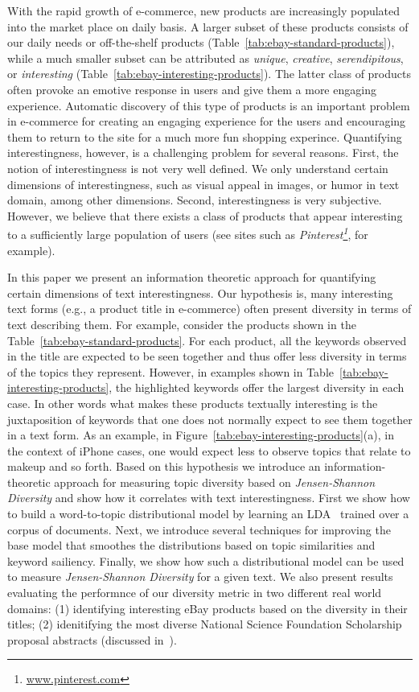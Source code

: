 


With the rapid growth of e-commerce, new products are increasingly populated into the market place on daily basis.  A larger subset of these products consists of our daily needs or off-the-shelf products (Table~\ref{tab:ebay-standard-products}), while a much smaller subset can be attributed as {\em unique}, {\em creative}, {\em serendipitous}, or {\em interesting} (Table~\ref{tab:ebay-interesting-products}). The latter class of products often provoke an emotive response in users and give them a more engaging experience. Automatic discovery of this type of products is an important problem in e-commerce for creating an engaging experience for the users and encouraging them to return to the site for a much more fun shopping experince. Quantifying interestingness, however,  is a challenging problem for several reasons. First, the notion of interestingness is not very well defined. We only understand certain dimensions of interestingness, such as visual appeal in images, or humor in text domain, among other dimensions. Second, interestingness is very subjective. However, we believe that there exists a class of products that appear interesting to a sufficiently large population of users (see sites such as {\em Pinterest\footnote{\url{www.pinterest.com}}}, for example).  

In this paper we present an information theoretic approach for quantifying certain dimensions of text interestingness. Our hypothesis is, many interesting text forms (e.g., a product title in e-commerce) often present diversity in terms of text describing them. For example, consider the products shown in the Table~\ref{tab:ebay-standard-products}. For each product, all the keywords observed in the title are expected to be seen together and thus offer less diversity in terms of the topics they represent. However, in examples shown in Table~\ref{tab:ebay-interesting-products}, the highlighted keywords 
offer the largest diversity in each case. In other words what makes these products textually interesting is the juxtaposition of keywords that one does not normally expect to see them together in a text form. As an example, in Figure~\ref{tab:ebay-interesting-products}(a), in the context of iPhone cases, one would expect less to observe topics that relate to makeup and so forth. Based on this hypothesis we introduce an information-theoretic approach for measuring topic diversity based on {\em Jensen-Shannon Diversity} and show how it correlates with text interestingness. First we show how to build a word-to-topic distributional model by learning an LDA~\cite{Blei:2003:LDA:944919.944937} trained over a corpus of documents. Next, we introduce several techniques for improving the base model that smoothes the distributions based on topic similarities and keyword sailiency. Finally, we show how such a distributional model can be used to measure {\em Jensen-Shannon Diversity} for a given text. We also present results evaluating the performnce of our diversity metric in two different real world domains: (1) identifying interesting eBay products based on the diversity in their titles; (2) idenitifying the most diverse National Science Foundation Scholarship proposal abstracts (discussed in~\cite{bache:2013}). 

